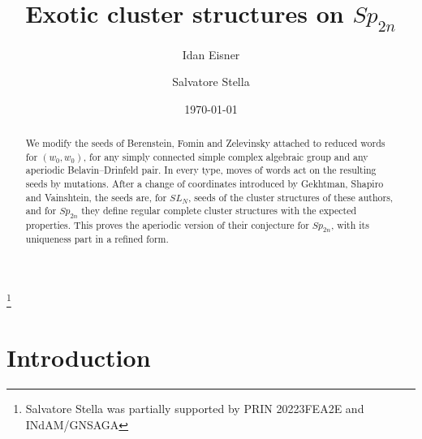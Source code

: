 \documentclass[a4paper]{amsart}
\numberwithin{equation}{section}
\theoremstyle{definition}
\theoremstyle{remark}
\begin{document}
\title{Exotic cluster structures on $Sp_{2n}$}
\author{Idan Eisner}
\address{Department of Computer Science, Tel-Hai University of the Galilee, Kiryat Shmona, Israel}
\author{Salvatore Stella}
\address{Universit\`a degli Studi dell'Aquila, Dipartimento di Ingegneria e Scienze dell'Informazione e Matematica, Via Vetoio, 67100 L'Aquila, Italy}
\thanks{Salvatore Stella was partially supported by PRIN 20223FEA2E and INdAM/GNSAGA}
\date{\today}

\begin{abstract}
  We modify the seeds of Berenstein, Fomin and Zelevinsky attached to reduced words for $(w_0,w_0)$, for any simply connected simple complex algebraic group and any aperiodic Belavin--Drinfeld pair.
  In every type, moves of words act on the resulting seeds by mutations. After a change of coordinates introduced by Gekhtman, Shapiro and Vainshtein, the seeds are, for $SL_N$, seeds of the cluster structures of these authors, and for $Sp_{2n}$ they define regular complete cluster structures with the expected properties. This proves the aperiodic version of their conjecture for $Sp_{2n}$, with its uniqueness part in a refined form.
\end{abstract}
\maketitle

\section{Introduction}
\label{sec: intro}
\end{document}
